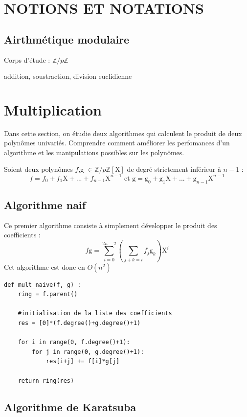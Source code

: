 \documentclass[a4paper]{article}
\begin{document}
\section{NOTIONS ET NOTATIONS}


\subsection{Airthmétique modulaire}

Corps d'étude : ${\mathbb{Z}/p \mathbb{Z}}$


addition, soustraction, division euclidienne

\section{Multiplication}

Dans cette section, on étudie deux algorithmes qui calculent le produit de deux polynômes univariés.
Comprendre comment améliorer les perfomances d'un algorithme et les manipulations possibles sur les polynômes.


Soient deux polynômes $f$,g $\in \mathbb{Z}/p\mathbb{Z}[\mathrm{X}]$ de degré strictement inférieur à $n-1$ :
\[
f=f_0+f_1\mathrm{X}+...+f_{n-1}\mathrm{X}^{n-1}\text{ et g}=\mathrm{g}_0+\mathrm{g}_1\mathrm{X}+...+\mathrm{g}_{n-1}\mathrm{X}^{n-1}
\]

\subsection{Algorithme naif}

Ce premier algorithme consiste à simplement développer le produit des coefficients :
\[
f\text{g}=\sum_{i=0}^{2n-2} (\sum_{j+k=i}f_j\mathrm{g}_k) \mathrm{X}^i
\]
Cet algorithme est donc en $O(n^2)$

\begin{lstlisting}[title={multiplication naive}]
    def mult_naive(f, g) :
    ring = f.parent()

    #initialisation de la liste des coefficients
    res = [0]*(f.degree()+g.degree()+1) 
    
    for i in range(0, f.degree()+1):
        for j in range(0, g.degree()+1):
            res[i+j] += f[i]*g[j]

    return ring(res) 
\end{lstlisting}


\subsection{Algorithme de Karatsuba}
\end{document}
